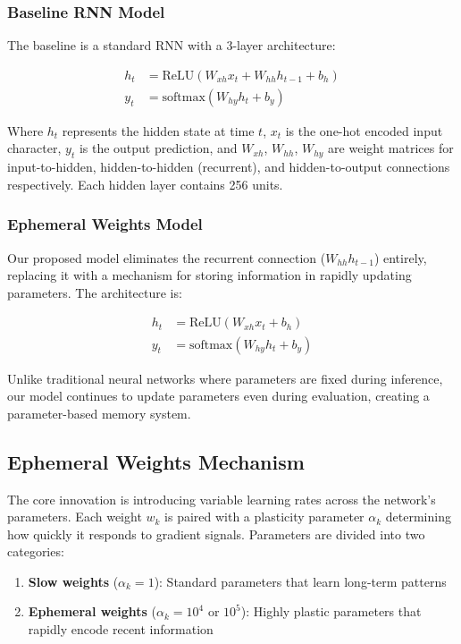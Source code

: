 \documentclass[conference]{IEEEtran}
\begin{document}
\subsubsection{Baseline RNN Model}

The baseline is a standard RNN with a 3-layer architecture:

\begin{align}
h_t &= \text{ReLU}(W_{xh}x_t + W_{hh}h_{t-1} + b_h)\\
y_t &= \text{softmax}(W_{hy}h_t + b_y)
\end{align}

Where $h_t$ represents the hidden state at time $t$, $x_t$ is the one-hot encoded input character, $y_t$ is the output prediction, and $W_{xh}$, $W_{hh}$, $W_{hy}$ are weight matrices for input-to-hidden, hidden-to-hidden (recurrent), and hidden-to-output connections respectively. Each hidden layer contains 256 units.

\subsubsection{Ephemeral Weights Model}

Our proposed model eliminates the recurrent connection ($W_{hh}h_{t-1}$) entirely, replacing it with a mechanism for storing information in rapidly updating parameters. The architecture is:

\begin{align}
h_t &= \text{ReLU}(W_{xh}x_t + b_h)\\
y_t &= \text{softmax}(W_{hy}h_t + b_y)
\end{align}

Unlike traditional neural networks where parameters are fixed during inference, our model continues to update parameters even during evaluation, creating a parameter-based memory system.

\subsection{Ephemeral Weights Mechanism}

The core innovation is introducing variable learning rates across the network's parameters. Each weight $w_k$ is paired with a plasticity parameter $\alpha_k$ determining how quickly it responds to gradient signals. Parameters are divided into two categories:

\begin{enumerate}
\item \textbf{Slow weights} ($\alpha_k = 1$): Standard parameters that learn long-term patterns
\item \textbf{Ephemeral weights} ($\alpha_k = 10^4$ or $10^5$): Highly plastic parameters that rapidly encode recent information
\end{enumerate}
\end{document}
